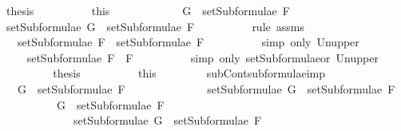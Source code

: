 \begin{isabellebody}
\ {\isacharquery}thesis\isanewline
\ \ \ \ \ \ \ \ \isamarkupfalse%
\ this\isanewline
\ \ \ \ \isamarkupfalse%
\isanewline
\ \ \ \ \ \ \isamarkupfalse%
\ {\isachardoublequoteopen}G\ {\isasymin}\ setSubformulae\ F{}{\isachardoublequoteclose}\isanewline
\ \ \ \ \ \ \isamarkupfalse%
\ \isamarkupfalse%
\ {\isachardoublequoteopen}setSubformulae\ G\ {\isasymsubseteq}\ setSubformulae\ F{}{\isachardoublequoteclose}\isanewline
\ \ \ \ \ \ \ \ \isamarkupfalse%
\ {\isacharparenleft}rule\ assms{\isacharparenleft}{}{\isacharparenright}{\isacharparenright}\isanewline
\ \ \ \ \ \ \isamarkupfalse%
\ \isamarkupfalse%
\ {\isachardoublequoteopen}{\isasymdots}\ {\isasymsubseteq}\ setSubformulae\ F{}\ {\isasymunion}\ setSubformulae\ F{}{\isachardoublequoteclose}\isanewline
\ \ \ \ \ \ \ \ \isamarkupfalse%
\ {\isacharparenleft}simp\ only{\isacharcolon}\ Un{\isacharunderscore}upper{}{\isacharparenright}\isanewline
\ \ \ \ \ \ \isamarkupfalse%
\ \isamarkupfalse%
\ {\isachardoublequoteopen}{\isasymdots}\ {\isasymsubseteq}\ setSubformulae\ {\isacharparenleft}F{}\ \isactrlbold {\isasymor}\ F{}{\isacharparenright}{\isachardoublequoteclose}\isanewline
\ \ \ \ \ \ \ \ \isamarkupfalse%
\ {\isacharparenleft}simp\ only{\isacharcolon}\ setSubformulae{\isacharunderscore}or\ Un{\isacharunderscore}upper{}{\isacharparenright}\isanewline
\ \ \ \ \ \ \isamarkupfalse%
\ \isamarkupfalse%
\ {\isacharquery}thesis\isanewline
\ \ \ \ \ \ \ \ \isamarkupfalse%
\ this\isanewline
\ \ \ \ \isamarkupfalse%
\isanewline
\ \ \isamarkupfalse%
\isanewline
{}\isamarkupfalse%
%
\endisatagproof
{\isafoldproof}%
%
\isadelimproof
\isanewline
%
\endisadelimproof
\isanewline
{}\isamarkupfalse%
\ subContsubformulae{\isacharunderscore}imp{\isacharcolon}\isanewline
\ \ \ {\isachardoublequoteopen}G\ {\isasymin}\ setSubformulae\ F{}\ \isanewline
\ \ \ \ \ \ \ \ \ \ \ \ {\isasymLongrightarrow}\ setSubformulae\ G\ {\isasymsubseteq}\ setSubformulae\ F{}{\isachardoublequoteclose}\isanewline
\ \ \ \ \ \ \ \ \ \ {\isachardoublequoteopen}G\ {\isasymin}\ setSubformulae\ F{}\ \isanewline
\ \ \ \ \ \ \ \ \ \ \ \ {\isasymLongrightarrow}\ setSubformulae\ G\ {\isasymsubseteq}\ setSubformulae\ F{}{\isachardoublequoteclose}\isanewline

\end{isabellebody}
